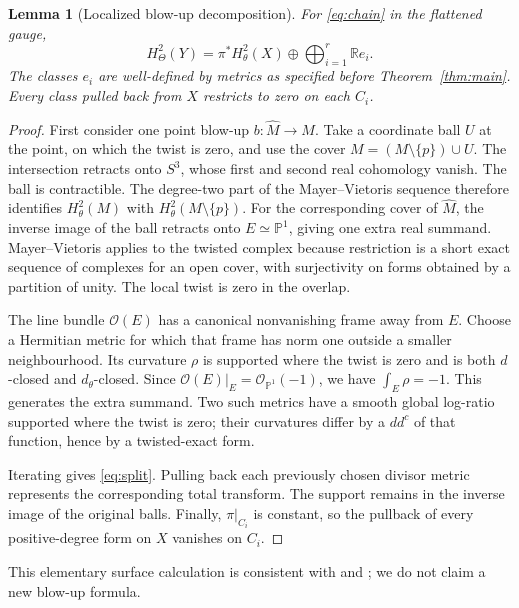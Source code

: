 \documentclass[12pt]{amsart}
\newtheorem{lem}[thm]{Lemma}
\theoremstyle{definition}
\theoremstyle{remark}
\numberwithin{equation}{section}
\newcommand{\cO}{\mathcal{O}}
\newcommand{\R}{\mathbb{R}}
\newcommand{\mP}{\mathbb{P}}
\begin{document}
\begin{lem}[Localized blow-up decomposition]\label{lem:cohomology}
For \eqref{eq:chain} in the flattened gauge,
\begin{equation}\label{eq:split}
 H^2_\Theta(Y)=\pi^*H^2_\theta(X)\oplus\bigoplus_{i=1}^r\R e_i.
\end{equation}
The classes $e_i$ are well-defined by metrics as specified before Theorem~\ref{thm:main}. Every class pulled back from $X$ restricts to zero on each $C_i$.
\end{lem}
\begin{proof}
First consider one point blow-up $b:\widehat M\to M$. Take a coordinate ball $U$ at the point, on which the twist is zero, and use the cover $M=(M\setminus\{p\})\cup U$. The intersection retracts onto $S^3$, whose first and second real cohomology vanish. The ball is contractible. The degree-two part of the Mayer--Vietoris sequence therefore identifies $H^2_\theta(M)$ with $H^2_\theta(M\setminus\{p\})$. For the corresponding cover of $\widehat M$, the inverse image of the ball retracts onto $E\simeq\mP^1$, giving one extra real summand. Mayer--Vietoris applies to the twisted complex because restriction is a short exact sequence of complexes for an open cover, with surjectivity on forms obtained by a partition of unity. The local twist is zero in the overlap.

The line bundle $\cO(E)$ has a canonical nonvanishing frame away from $E$. Choose a Hermitian metric for which that frame has norm one outside a smaller neighbourhood. Its curvature $\rho$ is supported where the twist is zero and is both $d$-closed and $d_\theta$-closed. Since $\cO(E)|_E=\cO_{\mP^1}(-1)$, we have $\int_E\rho=-1$. This generates the extra summand. Two such metrics have a smooth global log-ratio supported where the twist is zero; their curvatures differ by a $dd^c$ of that function, hence by a twisted-exact form.

Iterating gives \eqref{eq:split}. Pulling back each previously chosen divisor metric represents the corresponding total transform. The support remains in the inverse image of the original balls. Finally, $\pi|_{C_i}$ is constant, so the pullback of every positive-degree form on $X$ vanishes on $C_i$.
\end{proof}
This elementary surface calculation is consistent with \cite[Theorem 1.1]{YZ} and \cite[Theorem 1.2]{Meng}; we do not claim a new blow-up formula.
\end{document}
